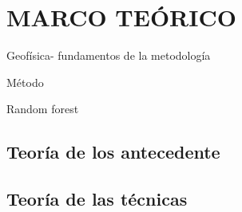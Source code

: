 \chapter{MARCO TEÓRICO}

Geofísica- fundamentos de la metodología  

Método

Random forest



\section{Teoría de los antecedente}

\section{Teoría de las técnicas}

